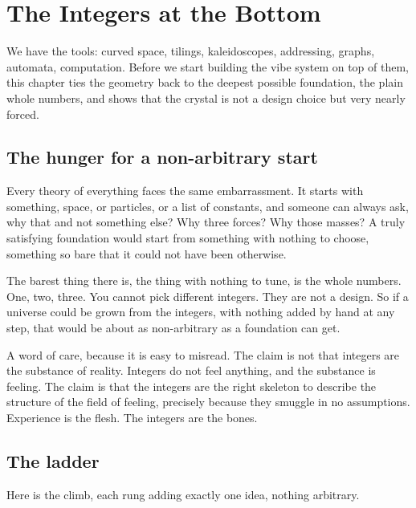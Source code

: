 \section{The Integers at the Bottom}

We have the tools: curved space, tilings, kaleidoscopes, addressing, graphs, automata, computation. Before we start building the vibe system on top of them, this chapter ties the geometry back to the deepest possible foundation, the plain whole numbers, and shows that the crystal is not a design choice but very nearly forced.

\subsection{The hunger for a non-arbitrary start}

Every theory of everything faces the same embarrassment. It starts with something, space, or particles, or a list of constants, and someone can always ask, why that and not something else? Why three forces? Why those masses? A truly satisfying foundation would start from something with nothing to choose, something so bare that it could not have been otherwise.

The barest thing there is, the thing with nothing to tune, is the whole numbers. One, two, three. You cannot pick different integers. They are not a design. So if a universe could be grown from the integers, with nothing added by hand at any step, that would be about as non-arbitrary as a foundation can get.

A word of care, because it is easy to misread. The claim is not that integers are the substance of reality. Integers do not feel anything, and the substance is feeling. The claim is that the integers are the right skeleton to describe the structure of the field of feeling, precisely because they smuggle in no assumptions. Experience is the flesh. The integers are the bones.

\subsection{The ladder}

Here is the climb, each rung adding exactly one idea, nothing arbitrary.

